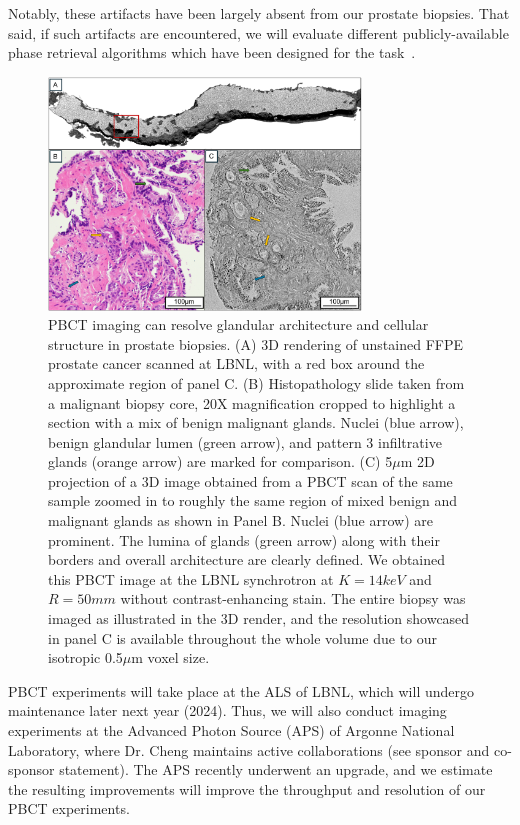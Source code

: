 \documentclass{NIHGrant}
\theoremstyle{theorem}
\begin{document}
Notably, these
artifacts have been largely absent from our prostate biopsies. That said, if
such artifacts are encountered, we will evaluate different publicly-available
phase retrieval algorithms which have been designed for the
task~\cite{mohan_non-linear_2023}.

\begin{figure}
  \vspace{-0.5cm} \includegraphics[width=0.74\textwidth]{ ./figures/fig1_resub.png }
  \caption{ PBCT imaging can resolve glandular architecture and cellular structure in prostate biopsies.
    (A) 3D rendering of unstained FFPE prostate cancer scanned at LBNL, with a red box around the approximate region of panel C. (B) Histopathology slide taken from a malignant biopsy core, 20X
    magnification cropped to highlight a section with a mix of benign malignant glands. Nuclei
    (blue arrow), benign glandular lumen (green arrow), and pattern 3 infiltrative glands (orange arrow) are marked for comparison. (C) 5$\mu$m
    2D projection of a 3D image obtained from a PBCT scan of the same sample
    zoomed in to roughly the same region of mixed benign and malignant glands as shown in Panel
    B. Nuclei (blue arrow) are prominent. The lumina of glands (green arrow)
    along with their borders and overall architecture are clearly defined. We obtained this PBCT image at
    the LBNL synchrotron at \(K=14keV\) and
    \(R=50mm\) without contrast-enhancing stain. The entire biopsy was
    imaged as illustrated in the 3D render, and the resolution showcased in panel C is available throughout the whole volume due to our isotropic 0.5$\mu$m voxel size.}\label{fig:match_histo}
 \vspace{0.1cm}
\end{figure}

PBCT experiments will take place at the ALS of LBNL, which will undergo maintenance later next year (2024). Thus, we will also conduct imaging experiments at the Advanced Photon Source (APS) of Argonne National Laboratory, where Dr. Cheng maintains active collaborations (see sponsor and co-sponsor statement). The APS recently underwent an upgrade, and we estimate the resulting improvements will improve the throughput and resolution of our PBCT experiments.
\end{document}

